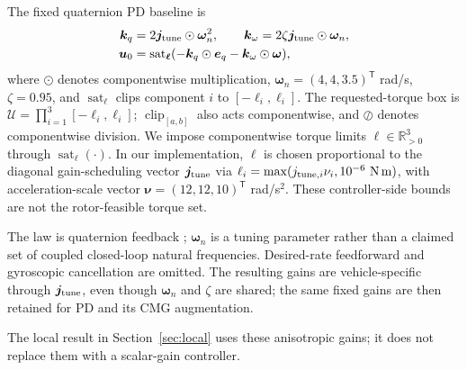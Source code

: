 \documentclass[letterpaper, 10 pt, conference]{ieeeconf}
\newcommand{\T}{^{\mathsf T}}
\newcommand{\sat}{\operatorname{sat}}
\newcommand{\clip}{\operatorname{clip}}
\begin{document}
The fixed quaternion PD baseline is
\begin{align}
 \bm k_q&=2\bm j_{\rm tune}\odot\bm\omega_n^2,\qquad
 \bm k_\omega=2\zeta\bm j_{\rm tune}\odot\bm\omega_n,\\
 \bm u_0&=\sat_{\bm\ell}
       (-\bm k_q\odot\bm e_q-\bm k_\omega\odot\bm\omega),
 \label{eq:pd}
\end{align}
where $\odot$ denotes componentwise multiplication,
$\bm\omega_n=(4,4,3.5)\T$ rad/s, $\zeta=0.95$, and
$\sat_{\bm\ell}$ clips component $i$ to $[-\ell_i,\ell_i]$.
The requested-torque box is $\mathcal U=\prod_{i=1}^3[-\ell_i,\ell_i]$;
$\clip_{[a,b]}$ also acts componentwise, and $\oslash$ denotes componentwise division.
We impose componentwise torque limits $\bm\ell\in\mathbb R_{>0}^3$ through $\sat_{\bm\ell}(\cdot)$. In our implementation, $\bm\ell$ is chosen proportional to the diagonal gain-scheduling vector $\bm j_{\rm tune}$ via
$\ell_i=\max(j_{{\rm tune},i}\nu_i,10^{-6}\ \mathrm{N\,m})$,
with acceleration-scale vector $\bm\nu=(12,12,10)\T$ rad/s$^2$.
These controller-side bounds are not the rotor-feasible torque set.

The law is quaternion feedback \cite{fresk2013quaternion}; $\bm\omega_n$ is a tuning parameter rather than a claimed set of coupled closed-loop natural frequencies.
Desired-rate feedforward and gyroscopic cancellation are omitted.
The resulting gains are vehicle-specific through $\bm j_{\rm tune}$, even though
$\bm\omega_n$ and $\zeta$ are shared; the same fixed gains are then retained
for PD and its CMG augmentation.

The local result in Section~\ref{sec:local} uses these anisotropic gains; it does not replace them with a scalar-gain controller.
\end{document}
